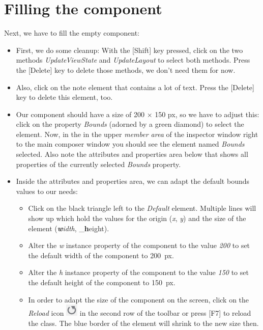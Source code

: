 \documentclass[
  a4paper,
,tablecaptionabove
]{scrbook}
\begin{document}
\hypertarget{_filling_the_component}{%
\section{Filling the component}\label{_filling_the_component}}

Next, we have to fill the empty component:

\begin{itemize}
\item
  First, we do some cleanup: With the {[}Shift{]} key pressed, click
  on the two methods \emph{UpdateViewState} and \emph{UpdateLayout} to
  select both methods. Press the {[}Delete{]} key to delete those
  methods, we don't need them for now.
\item
  Also, click on the note element that contains a lot of text. Press the
  {[}Delete{]} key to delete this element, too.
\item
  Our component should have a size of 200 × 150 px, so we have to adjust
  this: click on the property \emph{Bounds} (adorned by a green diamond)
  to select the element. Now, in the in the upper \emph{member area} of
  the inspector window right to the main composer window you should see
  the element named \emph{Bounds} selected. Also note the attributes and
  properties area below that shows all properties of the currently
  selected \emph{Bounds} property.
\item
  Inside the attributes and properties area, we can adapt the default
  bounds values to our needs:

  \begin{itemize}
  \item
    Click on the black triangle left to the \emph{Default} element.
    Multiple lines will show up which hold the values for the origin
    (\emph{x}, \emph{y}) and the size of the element
    (\emph{\textbf{w}idth}, \_\textbf{h}eight).
  \item
    Alter the \emph{w} instance property of the component to the value
    \emph{200} to set the default width of the component to 200~px.
  \item
    Alter the \emph{h} instance property of the component to the value
    \emph{150} to set the default height of the component to 150~px.
  \item
    In order to adapt the size of the component on the screen, click on
    the \emph{Reload} icon
    \includegraphics{./../asciidoc/modules/ROOT/assets/images/icons/ReloadIcon.png}
    in the second row of the toolbar or press {[}F7{]} to reload the
    class. The blue border of the element will shrink to the new size
    then.
  \end{itemize}
\end{itemize}
\end{document}
